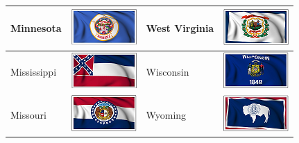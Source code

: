 \documentclass{ximera}
\begin{document}
\begin{center}
\begin{tabular}{|l|l|l|l|}
Minnesota & \includegraphics{pics/StateFlags/Minnesota.png} & West Virginia & \includegraphics{pics/StateFlags/WestVirginia.png} \\\hline 
Mississippi & \includegraphics{pics/StateFlags/Mississippi.png} & Wisconsin & \includegraphics{pics/StateFlags/Wisconsin.png} \\\hline 
Missouri & \includegraphics{pics/StateFlags/Missouri.png} & Wyoming & \includegraphics{pics/StateFlags/Wyoming.png} \\\hline 





\end{tabular}

\end{center}

\quad \\
\end{document}
